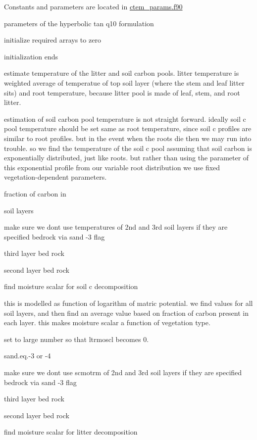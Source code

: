 Constants and parameters are located in \hyperlink{ctem__params_8f90}{ctem\+\_\+params.\+f90}

parameters of the hyperbolic tan q10 formulation 



initialize required arrays to zero

initialization ends 



estimate temperature of the litter and soil carbon pools. litter temperature is weighted average of temperatue of top soil layer (where the stem and leaf litter sits) and root temperature, because litter pool is made of leaf, stem, and root litter.

estimation of soil carbon pool temperature is not straight forward. ideally soil c pool temperature should be set same as root temperature, since soil c profiles are similar to root profiles. but in the event when the roots die then we may run into trouble. so we find the temperature of the soil c pool assuming that soil carbon is exponentially distributed, just like roots. but rather than using the parameter of this exponential profile from our variable root distribution we use fixed vegetation-\/dependent parameters.

fraction of carbon in

soil layers

make sure we don\textquotesingle{}t use temperatures of 2nd and 3rd soil layers if they are specified bedrock via sand -\/3 flag

third layer bed rock

second layer bed rock

find moisture scalar for soil c decomposition

this is modelled as function of logarithm of matric potential. we find values for all soil layers, and then find an average value based on fraction of carbon present in each layer. this makes moisture scalar a function of vegetation type.

set to large number so that ltrmoscl becomes 0.

sand.\+eq.-\/3 or -\/4

make sure we don\textquotesingle{}t use scmotrm of 2nd and 3rd soil layers if they are specified bedrock via sand -\/3 flag

third layer bed rock

second layer bed rock

find moisture scalar for litter decomposition

